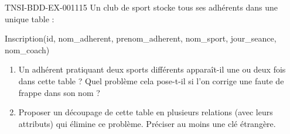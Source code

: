 \begin{exercice}{TNSI-BDD-EX-001}{1}{15}
Un club de sport stocke tous ses adhérents dans une unique table :
\begin{sql}
Inscription(id, nom_adherent, prenom_adherent, nom_sport, jour_seance, nom_coach)
\end{sql}
\begin{enumerate}
  \item Un adhérent pratiquant deux sports différents apparaît-il une ou deux fois dans cette table ? Quel problème cela pose-t-il si l'on corrige une faute de frappe dans son nom ?
  \item Proposer un découpage de cette table en plusieurs relations (avec leurs attributs) qui élimine ce problème. Préciser au moins une clé étrangère.
\end{enumerate}
\end{exercice}
